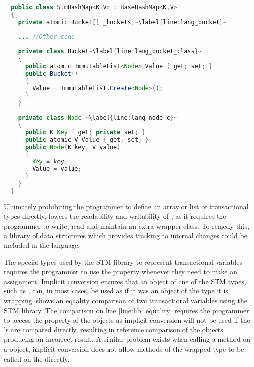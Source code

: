 \begin{lstlisting}[float,label=lst:lang_Buckets,
  caption={HashMap Buckets Array - \stmname},
  language=Java,  
  showspaces=false,
  showtabs=false,
  breaklines=true,
  showstringspaces=false,
  breakatwhitespace=true,
  escapechar=~,
  commentstyle=\color{greencomments},
  keywordstyle=\color{bluekeywords},
  stringstyle=\color{redstrings},
  morekeywords={atomic, retry, orelse, var, get, set, ref, out}]  % Start your code-block
  
  public class StmHashMap<K,V> : BaseHashMap<K,V>
  {
    private atomic Bucket[] _buckets;~\label{line:lang_bucket}~
  
    ... //Other code
    
    private class Bucket~\label{line:lang_bucket_class}~
    {
      public atomic ImmutableList<Node> Value { get; set; }
      public Bucket()
      {
        Value = ImmutableList.Create<Node>();
      }
    }
  
    private class Node ~\label{line:lang_node_c}~
    {
      public K Key { get; private set; }
      public atomic V Value { get; set; }
      public Node(K key, V value)
      {
        Key = key;
        Value = value;
      }
    }
  }
\end{lstlisting}

Ultimately prohibiting the programmer to define an array or list of transactional types directly, lowers the readability and writability of \stmname, as it requires the programmer to write, read and maintain an extra wrapper class. To remedy this, a library of data structures which provides tracking to internal changes could be included in the language. 

The special types used by the \ac{STM} library to represent transactional variables requires the programmer to use the  property whenever they need to make an assignment. Implicit conversion ensures that an object of one of the \ac{STM} types, such as , can, in most cases, be used as if it was an object of the type it is wrapping.  shows an equality comparison of two transactional variables using the \ac{STM} library. The comparison on line \ref{line:lib_equality} requires the programmer to access the  property of the  objects as implicit conversion will not be used if the 's are compared directly, resulting in reference comparison of the  objects producing an incorrect result. A similar problem exists when calling a method on a  object, implicit conversion does not allow methods of the wrapped type to be called on the  directly. 

